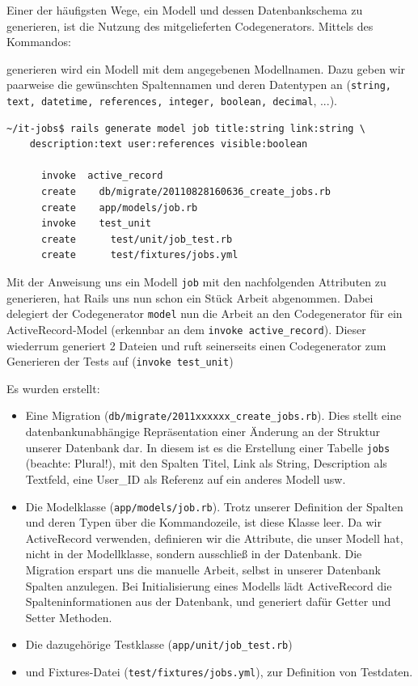 Einer der häufigsten Wege, ein Modell und dessen Datenbankschema zu generieren, ist die Nutzung des mitgelieferten Codegenerators. Mittels des Kommandos:


generieren wird ein Modell mit dem angegebenen Modellnamen. Dazu geben wir paarweise die gewünschten Spaltennamen und deren Datentypen an (\texttt{string, text, datetime, references, integer, boolean, decimal}, ...).
\begin{lstlisting}
~/it-jobs$ rails generate model job title:string link:string \
    description:text user:references visible:boolean

      invoke  active_record
      create    db/migrate/20110828160636_create_jobs.rb
      create    app/models/job.rb
      invoke    test_unit
      create      test/unit/job_test.rb
      create      test/fixtures/jobs.yml

\end{lstlisting}
Mit der Anweisung uns ein Modell \texttt{job} mit den nachfolgenden Attributen zu generieren, hat Rails uns nun schon ein Stück Arbeit abgenommen. Dabei delegiert der Codegenerator \texttt{model} nun die Arbeit an den Codegenerator für ein ActiveRecord-Model (erkennbar an dem \texttt{invoke active\_record}). Dieser wiederrum generiert 2 Dateien und ruft seinerseits einen Codegenerator zum Generieren der Tests auf (\texttt{invoke test\_unit})

Es wurden erstellt:
\begin{itemize}
 \item Eine Migration (\verb|db/migrate/2011xxxxxx_create_jobs.rb|). Dies stellt eine datenbankunabhängige Repräsentation einer Änderung an der Struktur unserer Datenbank dar. In diesem ist es die Erstellung einer Tabelle \texttt{jobs} (beachte: Plural!), mit den Spalten Titel, Link als String, Description als Textfeld, eine User\_ID als Referenz auf ein anderes Modell usw.
 \item Die Modelklasse (\verb|app/models/job.rb|). Trotz unserer Definition der Spalten und deren Typen über die Kommandozeile, ist diese Klasse leer. Da wir ActiveRecord\index{ActiveRecord} verwenden, definieren wir die Attribute, die unser Modell hat, nicht in der Modellklasse, sondern ausschließ in der Datenbank. Die Migration erspart uns die manuelle Arbeit, selbst in unserer Datenbank Spalten anzulegen. Bei Initialisierung eines Modells lädt ActiveRecord die Spalteninformationen aus der Datenbank, und generiert dafür Getter und Setter Methoden. 
 \item Die dazugehörige Testklasse (\verb|app/unit/job_test.rb|)
 \item und Fixtures-Datei (\verb|test/fixtures/jobs.yml|), zur Definition von Testdaten. 
\end{itemize}

